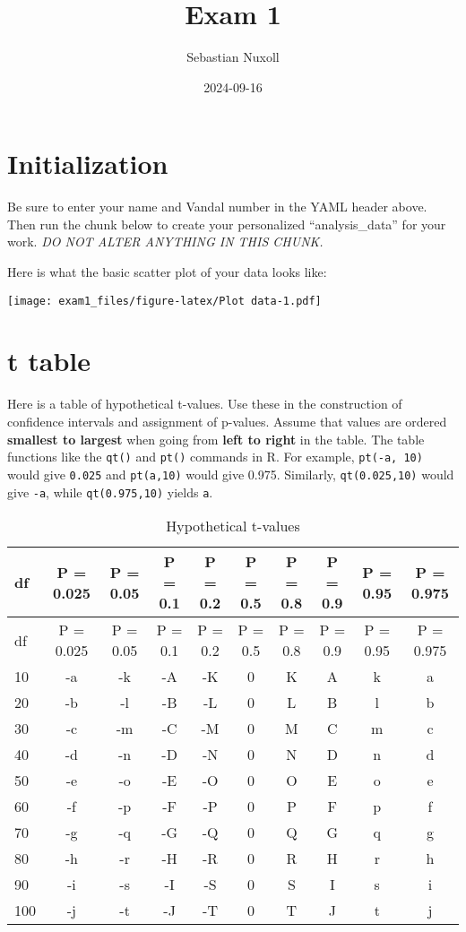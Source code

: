 \documentclass[
]{article}
\title{Exam 1}
\author{Sebastian Nuxoll}
\date{2024-09-16}
\begin{document}
\maketitle

\hypertarget{initialization}{%
\section{Initialization}\label{initialization}}

Be sure to enter your name and Vandal number in the YAML header above.
Then run the chunk below to create your personalized ``analysis\_data''
for your work. \emph{DO NOT ALTER ANYTHING IN THIS CHUNK.}

Here is what the basic scatter plot of your data looks like:

\texttt{[image: exam1\_files/figure-latex/Plot data-1.pdf]}

\hypertarget{t-table}{%
\section{t table}\label{t-table}}

Here is a table of hypothetical t-values. Use these in the construction
of confidence intervals and assignment of p-values. Assume that values
are ordered \textbf{smallest to largest} when going from \textbf{left to
right} in the table. The table functions like the \texttt{qt()} and
\texttt{pt()} commands in R. For example, \texttt{pt(-a,\ 10)} would
give \texttt{0.025} and \texttt{pt(a,10)} would give 0.975. Similarly,
\texttt{qt(0.025,10)} would give \texttt{-a}, while
\texttt{qt(0.975,10)} yields \texttt{a}.

\begin{longtable}[]{@{}lccccccccc@{}}
\caption{Hypothetical t-values}\tabularnewline
\toprule
df & P = 0.025 & P = 0.05 & P = 0.1 & P = 0.2 & P = 0.5 & P = 0.8 & P =
0.9 & P = 0.95 & P = 0.975\tabularnewline
\midrule
\endfirsthead
\toprule
df & P = 0.025 & P = 0.05 & P = 0.1 & P = 0.2 & P = 0.5 & P = 0.8 & P =
0.9 & P = 0.95 & P = 0.975\tabularnewline
\midrule
\endhead
10 & -a & -k & -A & -K & 0 & K & A & k & a\tabularnewline
20 & -b & -l & -B & -L & 0 & L & B & l & b\tabularnewline
30 & -c & -m & -C & -M & 0 & M & C & m & c\tabularnewline
40 & -d & -n & -D & -N & 0 & N & D & n & d\tabularnewline
50 & -e & -o & -E & -O & 0 & O & E & o & e\tabularnewline
60 & -f & -p & -F & -P & 0 & P & F & p & f\tabularnewline
70 & -g & -q & -G & -Q & 0 & Q & G & q & g\tabularnewline
80 & -h & -r & -H & -R & 0 & R & H & r & h\tabularnewline
90 & -i & -s & -I & -S & 0 & S & I & s & i\tabularnewline
100 & -j & -t & -J & -T & 0 & T & J & t & j\tabularnewline
\bottomrule
\end{longtable}
\end{document}
